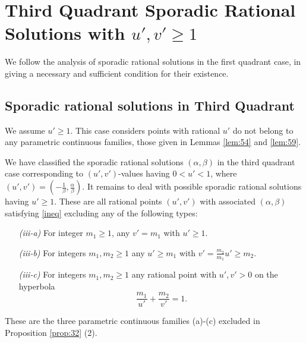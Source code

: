 \documentclass[12pt,letterpaper, reqno]{amsart}
\theoremstyle{definition}
\theoremstyle{remark}
\newcommand{\uu}{{u'}}
\newcommand{\vv}{{v'}}
\begin{document}
\section{Third Quadrant Sporadic Rational Solutions with $u', v' \ge 1$}\label{sec:9}


We follow the analysis of sporadic rational solutions in the first quadrant case,
in giving a necessary and sufficient condition for their existence. 

%
%
\subsection{Sporadic rational solutions in Third Quadrant}\label{sec:92}

We  assume ${\uu} \ge 1$.
This case  considers points with rational $\uu$ do not belong to any
parametric continuous families, those
 given in Lemmas \ref{lem:54} and \ref{lem:59}.

We have classified the sporadic rational solutions $(\alpha, \beta)$
in the third quadrant case corresponding to $(\uu, \vv)$-values having  $0 < {\uu} <1$,
where $(\uu, \vv) = (-\frac{1}{\beta}, \frac{\alpha}{\beta})$.
It remains to deal with possible sporadic rational solutions 
having  ${\uu} \ge 1$. These are all rational points $(\uu, \vv)$ with associated $(\alpha, \beta)$
satisfying \eqref{ineq} excluding any of the following types: 
\begin{enumerate}
\item[{\it (iii-a)}] For integer $m_1 \ge 1$, any  $\vv= {m_1}$  with  $\uu \ge {1}$.
\item[{\it (iii-b)}] For integers $m_1, m_2 \ge 1$ any  $\uu\geq{m_1}$  with $ \vv =\frac{m_2}{m_1}\uu\geq{m_2}.$
\item[{\it (iii-c)}] For integers $m_1, m_2 \ge 1$ any  rational point with $\uu, \vv >0$ on the hyperbola 
$$
\frac{m_1}{{\uu}} + \frac{m_2}{{\vv}} =1.
$$
\end{enumerate}
These are the three parametric continuous families (a)-(c) excluded
in Proposition \ref{prop:32} (2).
\end{document}
